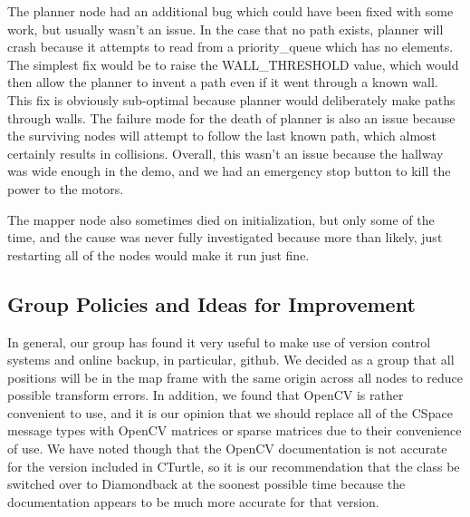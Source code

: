 \documentclass{article}
\begin{document}
The planner node had an additional bug which could have been fixed with some work, but usually wasn't an issue.  
In the case that no path exists, planner will crash because it attempts to read from a priority_queue which has no elements.
The simplest fix would be to raise the WALL_THRESHOLD value, which would then allow the planner to invent a path even if it went through a known wall.  
This fix is obviously sub-optimal because planner would deliberately make paths through walls.
The failure mode for the death of planner is also an issue because the surviving nodes will attempt to follow the last known path, which almost certainly results in collisions.
Overall, this wasn't an issue because the hallway was wide enough in the demo, and we had an emergency stop button to kill the power to the motors.


The mapper node also sometimes died on initialization, but only some of the time, and the cause was never fully investigated because more than likely, just restarting all of the nodes would make it run just fine.

\subsection{Group Policies and Ideas for Improvement}

In general, our group has found it very useful to make use of version control systems and online backup, in particular, github.
We decided as a group that all positions will be in the map frame with the same origin across all nodes to reduce possible transform errors.
In addition, we found that OpenCV is rather convenient to use, and it is our opinion that we should replace all of the CSpace message types with OpenCV matrices or sparse matrices due to their convenience of use.
We have noted though that the OpenCV documentation is not accurate for the version included in CTurtle, so it is our recommendation that the class be switched over to Diamondback at the soonest possible time because the documentation appears to be much more accurate for that version.
\end{document}
